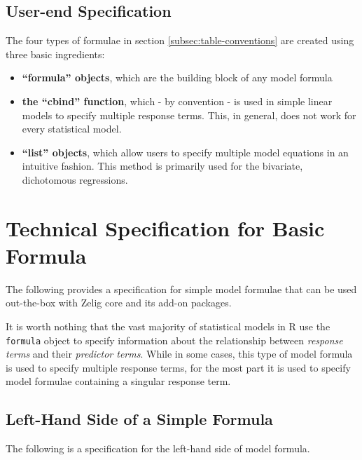 \documentclass{article}
\begin{document}
\subsection{User-end Specification}
\label{subsec:user-spec-formula}

The four types of formulae in section \ref{subsec:table-conventions} are created
using three basic ingredients:

\begin{itemize}

  \item {\bf ``formula'' objects}, which are the building block of any model
    formula

  \item {\bf the ``cbind'' function}, which - by convention - is used in simple
    linear models to specify multiple response terms. This, in general, does not
    work for every statistical model.

  \item {\bf ``list'' objects}, which allow users to specify multiple
    model equations in an intuitive fashion. This method is primarily used for
    the bivariate, dichotomous regressions.

\end{itemize}


\pagebreak


%
%
%
\section{Technical Specification for Basic Formula}

The following provides a specification for simple model formulae that can be
used out-the-box with Zelig core and its add-on packages.

It is worth nothing that the vast majority of statistical models in R use the
\verb|formula| object to specify information about the relationship between
\emph{response terms} and their \emph{predictor terms}. While in some cases,
this type of model formula is used to specify multiple response terms, for the
most part it is used to specify model formulae containing a singular response
term.


\subsection{Left-Hand Side of a Simple Formula}
\label{subsec:lhs}

The following is a specification for the left-hand side of model formula.
\end{document}
